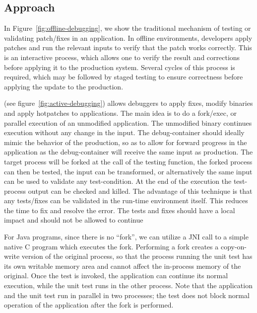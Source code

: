 \subsection{Approach}
\label{sec:guided-approach}

In Figure~\ref{fig:offline-debugging}, we show the traditional mechanism of testing or validating patch/fixes in an application. 
In offline environments, developers apply patches and run the relevant inputs to verify that the patch works correctly. 
This is an interactive process, which allows one to verify the result and corrections before applying it to the production system.
Several cycles of this process is required, which may be followed by staged testing to ensure correctness before applying the update to the production.


\activedebugging (see figure~\ref{fig:active-debugging}) allows debuggers to apply fixes, modify binaries and apply hotpatches to applications. 
The main idea is to do a fork/exec, or parallel execution of an unmodified application.
The unmodified binary continues execution without any change in the input.
The debug-container should ideally mimic the behavior of the production, so as to allow for forward progress in the application as the debug-container will receive the same input as production.
The target process will be forked at the call of the testing function, the forked process can then be tested, the input can be transformed, or alternatively the same input can be used to validate any test-condition. 
At the end of the execution the test-process output can be checked and killed. 
The advantage of this technique is that any tests/fixes can be validated in the run-time environment itself.
This reduces the time to fix and resolve the error. 
The tests and fixes should have a local impact and should not be allowed to continue 

For Java programs, since there is no “fork”, we can utilize a JNI call to a simple native C program which executes the fork. 
Performing a fork creates a copy-on-write version of the original process, so that the process running the unit test has its own writable memory area and cannot affect the in-process memory of the original. 
Once the test is invoked, the application can continue its normal execution, while the unit test runs in the other process. 
Note that the application and the unit test run in parallel in two processes; the test does not block normal operation of the application after the fork is performed.


